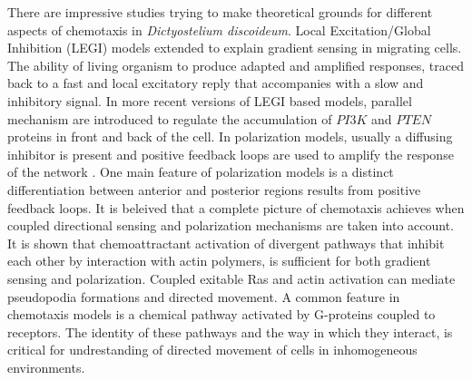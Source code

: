 \documentclass[10pt,letterpaper]{article}
\begin{document}
There are impressive studies trying to make theoretical grounds for different aspects of chemotaxis in \textit{Dictyostelium discoideum}. Local Excitation/Global Inhibition (LEGI) models extended to explain gradient sensing in migrating cells. The ability of living organism to produce adapted and amplified responses, traced back to a fast and local excitatory reply that accompanies with a slow and inhibitory signal\cite{leg1,leg2,leg3}. In more recent versions of LEGI based models, parallel mechanism are introduced to regulate the accumulation of $ PI3K $ and $ PTEN $ proteins in front and back of the cell\cite{leg4}. In polarization models, usually a diffusing inhibitor is present and positive feedback loops are used to amplify the response of the network \cite{pol6,pol7}. One main feature of polarization models is a distinct differentiation between anterior and posterior regions results from positive feedback loops. It is beleived that a complete picture of chemotaxis achieves when coupled directional sensing and polarization mechanisms are taken into account. It is shown that chemoattractant activation of divergent pathways that inhibit each other by interaction with actin polymers, is sufficient for both gradient sensing and polarization\cite{pol8}. Coupled exitable Ras and actin activation can mediate pseudopodia formations and directed movement\cite{cop1}. A common feature in chemotaxis models is a chemical pathway activated by G-proteins coupled to receptors. The identity of these pathways and the way in which they interact, is critical for undrestanding of directed movement of cells in inhomogeneous environments.\\  
\end{document}
